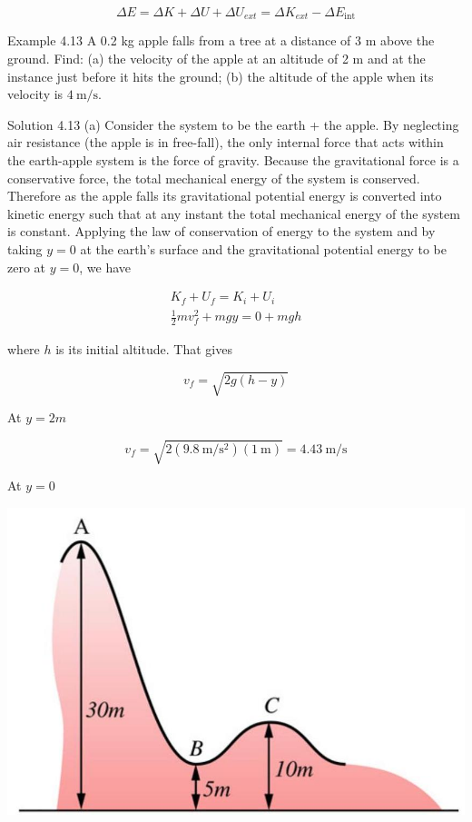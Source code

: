 \documentclass[10pt]{article}
\begin{document}
$$
\Delta E=\Delta K+\Delta U+\Delta U_{e x t}=\Delta K_{e x t}-\Delta E_{\mathrm{int}}
$$

Example 4.13 A 0.2 kg apple falls from a tree at a distance of 3 m above the ground. Find: (a) the velocity of the apple at an altitude of 2 m and at the instance just before it hits the ground; (b) the altitude of the apple when its velocity is $4 \mathrm{~m} / \mathrm{s}$.

Solution 4.13 (a) Consider the system to be the earth + the apple. By neglecting air resistance (the apple is in free-fall), the only internal force that acts within the earth-apple system is the force of gravity. Because the gravitational force is a conservative force, the total mechanical energy of the system is conserved. Therefore as the apple falls its gravitational potential energy is converted into kinetic energy such that at any instant the total mechanical energy of the system is constant. Applying the law of conservation of energy to the system and by taking $y=0$ at the earth's surface and the gravitational potential energy to be zero at $y=0$, we have

$$
\begin{gathered}
K_{f}+U_{f}=K_{i}+U_{i} \\
\frac{1}{2} m v_{f}^{2}+m g y=0+m g h
\end{gathered}
$$

where $h$ is its initial altitude. That gives

$$
v_{f}=\sqrt{2 g(h-y)}
$$

At $y=2 m$

$$
v_{f}=\sqrt{2\left(9.8 \mathrm{~m} / \mathrm{s}^{2}\right)(1 \mathrm{~m})}=4.43 \mathrm{~m} / \mathrm{s}
$$

At $y=0$

\begin{center}
\includegraphics[max width=\textwidth]{2024_09_13_db1f357d2aad0a03eb2eg-073(1)}
\end{center}
\end{document}
